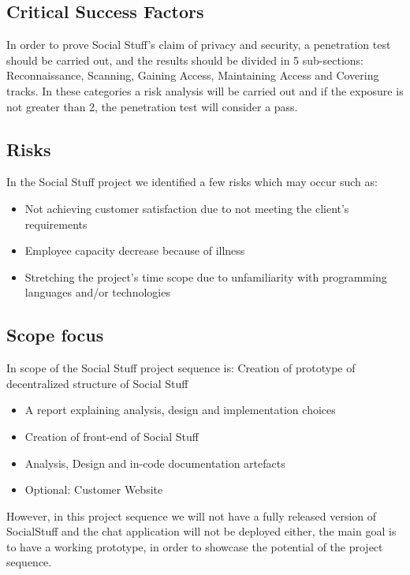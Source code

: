 \subsection{Critical Success Factors}\label{subsec:critical-success-factors}

In order to prove Social Stuff’s claim of privacy and security, a penetration test should be carried out, and the
results should be divided in 5 sub-sections: Reconnaissance, Scanning, Gaining Access, Maintaining Access and Covering
tracks.
In these categories a risk analysis will be carried out and if the exposure is not greater than 2, the penetration test
will consider a pass.

\subsection{Risks}\label{subsec:risks}

In the Social Stuff project we identified a few risks which may occur such as:

\begin{itemize}
    \item Not achieving customer satisfaction due to not meeting the client’s requirements
    \item Employee capacity decrease because of illness
    \item Stretching the project’s time scope due to unfamiliarity with programming languages and/or technologies
\end{itemize}

\subsection{Scope focus}

In scope of the Social Stuff project sequence is: Creation of prototype of decentralized structure of Social Stuff

\begin{itemize}
    \item A report explaining analysis, design and implementation choices
    \item Creation of front-end of Social Stuff
    \item Analysis, Design and in-code documentation artefacts
    \item Optional: Customer Website
\end{itemize}

However, in this project sequence we will not have a fully released version of SocialStuff and the chat application
will not be deployed either, the main goal is to have a working prototype, in order to showcase the potential of the
project sequence.

